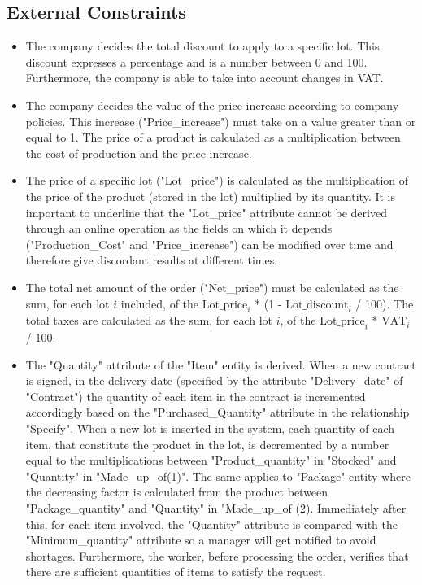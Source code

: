 \subsection{External Constraints}
\begin{itemize}
\item The company decides the total discount to apply to a specific lot. This discount expresses a percentage and is a number between 0 and 100. Furthermore, the company is able to take into account changes in VAT.
\item The company decides the value of the price increase according to company policies. This increase ("Price\_increase") must take on a value greater than or equal to 1. The price of a product is calculated as a multiplication between the cost of production and the price increase.
\item The price of a specific lot ("Lot\_price") is calculated as the multiplication of the price of the product (stored in the lot) multiplied by its quantity. It is important to underline that the "Lot\_price" attribute cannot be derived through an online operation as the fields on which it depends ("Production\_Cost" and "Price\_increase") can be modified over time and therefore give discordant results at different times.
\item The total net amount of the order ("Net\_price") must be calculated as the sum, for each lot $i$ included, of the $ \mathrm{Lot\_price}_i $ * (1 - $ \mathrm{Lot\_discount}_i $ / 100). The total taxes are calculated as the sum, for each lot $i$, of the $ \mathrm{Lot\_price}_i $ * $ \mathrm{VAT}_i $ / 100.
\item The "Quantity" attribute of the "Item" entity is derived. When a new contract is signed, in the delivery date (specified by the attribute "Delivery\_date" of "Contract") the quantity of each item in the contract is incremented accordingly based on the "Purchased\_Quantity" attribute in the relationship "Specify". When a new lot is inserted in the system, each quantity of each item, that constitute the product in the lot, is decremented by a number equal to the multiplications between "Product\_quantity" in "Stocked" and "Quantity" in "Made\_up\_of(1)". The same applies to "Package" entity where the decreasing factor is calculated from the product between "Package\_quantity" and "Quantity" in "Made\_up\_of (2). Immediately after this, for each item involved, the "Quantity" attribute is compared with the "Minimum\_quantity" attribute so a manager will get notified to avoid shortages. Furthermore, the worker, before processing the order, verifies that there are sufficient quantities of items to satisfy the request.

\end{itemize}

